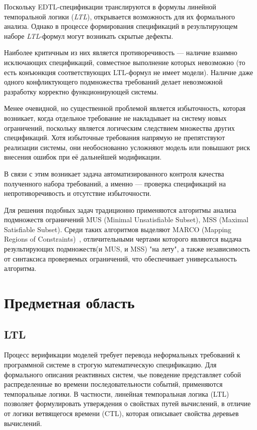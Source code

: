 Поскольку EDTL-спецификации транслируются в формулы линейной темпоральной логики (\textit{LTL}), открывается возможность для их формального анализа. Однако в процессе формирования спецификаций в результирующем наборе \textit{LTL}-формул могут возникать скрытые дефекты.

Наиболее критичным из них является противоречивость — наличие взаимно исключающих спецификаций, совместное выполнение которых невозможно (то есть конъюнкция соответствующих LTL-формул не имеет модели). Наличие даже одного конфликтующего подмножества требований делает невозможной разработку корректно функционирующей системы.

Менее очевидной, но существенной проблемой является избыточность, которая возникает, когда отдельное требование не накладывает на систему новых ограничений, поскольку является логическим следствием множества других спецификаций. Хотя избыточные требования напрямую не препятствуют реализации системы, они необоснованно усложняют модель или повышают риск внесения ошибок при её дальнейшей модификации.

В связи с этим возникает  задача автоматизированного контроля качества полученного набора требований, а именно — проверка спецификаций на непротиворечивость и отсутствие избыточности.

Для решения подобных задач традиционно применяются алгоритмы анализа подмножеств ограничений MUS (Minimal Unsatisfiable Subset), MSS (Maximal Satisfiable Subset). Среди таких алгоритмов выделяют MARCO (Mapping Regions of Constraints)~\cite{marco}, отличительными чертами которого являются выдача результирующих подмножеств(и MUS, и MSS) "на лету", а также независимость от синтаксиса проверяемых ограничений, что обеспечивает универсальность алгоритма.


\clearpage
\pagebreak

\section{Предметная область}\label{sec:overview}
\subsection{LTL}\label{sec:ltl}

Процесс верификации моделей требует перевода неформальных требований к программной системе в строгую математическую спецификацию. Для формального описания реактивных систем, чье поведение представляет собой распределенные во времени последовательности событий, применяются темпоральные логики. В частности, линейная темпоральная логика (LTL) позволяет формулировать утверждения о свойствах путей вычислений, в отличие от логики ветвящегося времени (CTL), которая описывает свойства деревьев вычислений.

